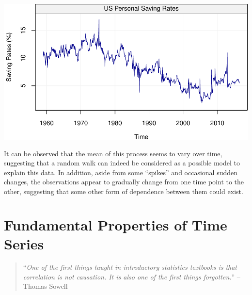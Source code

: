 \documentclass[]{book}
\newenvironment{Shaded}{\begin{snugshade}}{\end{snugshade}}
\newcommand{\KeywordTok}[1]{\textcolor[rgb]{0.13,0.29,0.53}{\textbf{#1}}}
\newcommand{\DataTypeTok}[1]{\textcolor[rgb]{0.13,0.29,0.53}{#1}}
\newcommand{\DecValTok}[1]{\textcolor[rgb]{0.00,0.00,0.81}{#1}}
\newcommand{\StringTok}[1]{\textcolor[rgb]{0.31,0.60,0.02}{#1}}
\newcommand{\CommentTok}[1]{\textcolor[rgb]{0.56,0.35,0.01}{\textit{#1}}}
\newcommand{\NormalTok}[1]{#1}
\theoremstyle{definition}
\theoremstyle{definition}
\theoremstyle{definition}
\theoremstyle{remark}
\begin{document}
\begin{Shaded}
\end{Shaded}

\includegraphics{ts_files/figure-latex/example_PSR-1.pdf}

It can be observed that the mean of this process seems to vary over
time, suggesting that a random walk can indeed be considered as a
possible model to explain this data. In addition, aside from some
``spikes'' and occasional sudden changes, the observations appear to
gradually change from one time point to the other, suggesting that some
other form of dependence between them could exist.

\chapter{Fundamental Properties of Time Series}\label{fundtimeseries}

\begin{quote}
``\emph{One of the first things taught in introductory statistics
textbooks is that correlation is not causation. It is also one of the
first things forgotten.}'' -- Thomas Sowell
\end{quote}
\end{document}
